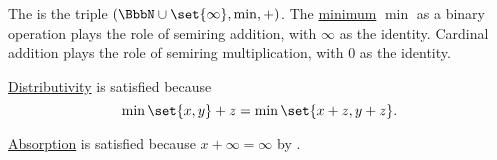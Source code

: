 \begin{example}
\begin{thmenum}
    The  is the triple \( (\BbbN \cup \set{ \infty }, \min, +) \). The \hyperref[def:partially_ordered_set_extremal_points/maximum_and_minimum]{minimum} \( \min \) as a binary operation plays the role of semiring addition, with \( \infty \) as the identity. Cardinal addition plays the role of semiring multiplication, with \( 0 \) as the identity.

    \hyperref[def:semiring/left_distributivity]{Distributivity} is satisfied because
    \begin{equation*}
      \min\set{ x, y } + z = \min\set{ x + z , y + z }.
    \end{equation*}

    \hyperref[def:semiring/absorption]{Absorption} is satisfied because \( x + \infty = \infty \) by .
  \end{thmenum}
\end{example}

